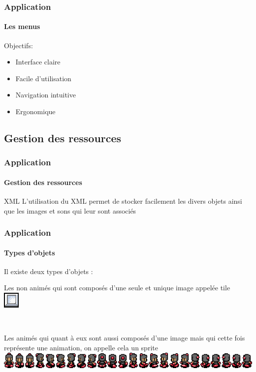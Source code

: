 	\begin{frame}
	\frametitle{Application}
	\framesubtitle{Les menus}
	
		\begin{block}{Objectifs:}
			\begin{itemize}
			  \item Interface claire
			  \item Facile d'utilisation
			  \item Navigation intuitive
			  \item Ergonomique
			\end{itemize}
		\end{block}
	\end{frame}
	
\subsection{Gestion des ressources}

	\begin{frame}
		\frametitle{Application}
		\framesubtitle{Gestion des ressources}
		
		\begin{block}{XML}
			L'utilisation du XML permet de stocker facilement les divers objets ainsi que
			les images et sons qui leur sont associés
		\end{block}
		
	\end{frame}
	
	\begin{frame}
		\frametitle{Application}
		\framesubtitle{Types d'objets}
			Il existe deux types d'objets :
			
			\begin{center}
				Les non animés qui sont composés d'une seule et unique image appelée tile \\
				\includegraphics[scale=0.75]{img/bloc.png}
				
				$\,$
				
				\item Les animés qui quant à eux sont aussi composés d'une image mais qui cette fois représente une animation, on appelle cela un sprite \\
				\includegraphics[scale=0.40]{img/player.png}
			\end{center}		
	\end{frame}
	
